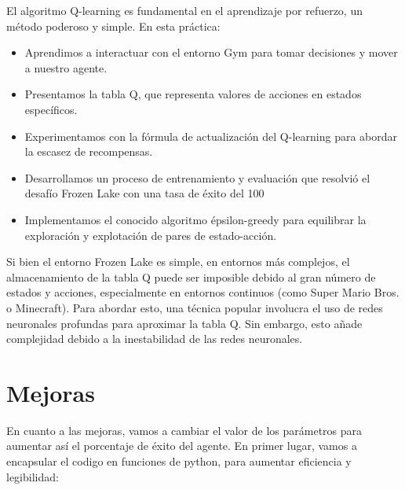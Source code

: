 \documentclass{article}
\begin{document}
\vspace{1cm}

El algoritmo Q-learning es fundamental en el aprendizaje por refuerzo, un método poderoso y simple. En esta práctica:

\vspace{0.5cm}

\begin{itemize}
    \item Aprendimos a interactuar con el entorno Gym para tomar decisiones y mover a nuestro agente.
    \item Presentamos la tabla Q, que representa valores de acciones en estados específicos.
    \item Experimentamos con la fórmula de actualización del Q-learning para abordar la escasez de recompensas.
    \item Desarrollamos un proceso de entrenamiento y evaluación que resolvió el desafío Frozen Lake con una tasa de éxito del 100%
    \item Implementamos el conocido algoritmo épsilon-greedy para equilibrar la exploración y explotación de pares de estado-acción.
\end{itemize}

\vspace{0.5cm}

Si bien el entorno Frozen Lake es simple, en entornos más complejos, el almacenamiento de la tabla Q puede ser imposible debido al gran número de estados y acciones, especialmente en entornos continuos (como Super Mario Bros. o Minecraft). Para abordar esto, una técnica popular involucra el uso de redes neuronales profundas para aproximar la tabla Q. Sin embargo, esto añade complejidad debido a la inestabilidad de las redes neuronales.

\vspace{1cm}

\section{Mejoras}

\vspace{1cm}

En cuanto a las mejoras, vamos a cambiar el valor de los parámetros para aumentar así el porcentaje de éxito del agente. En primer lugar, vamos a encapsular el codigo en funciones de python, para aumentar eficiencia y legibilidad:

\vspace{0.5cm}
\end{document}
